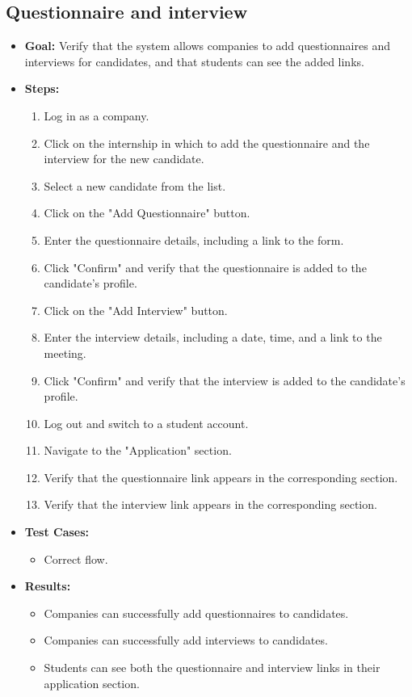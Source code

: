 \subsection{Questionnaire and interview}
\begin{itemize}
    \item \textbf{Goal:} Verify that the system allows companies to add questionnaires and interviews for candidates, and that students can see the added links.

    \item \textbf{Steps:}
    \begin{enumerate}
        \item Log in as a company.
        \item Click on the internship in which to add the questionnaire and the interview for the new candidate.
        \item Select a new candidate from the list.
        \item Click on the "Add Questionnaire" button.
        \item Enter the questionnaire details, including a link to the form.
        \item Click "Confirm" and verify that the questionnaire is added to the candidate’s profile.
        \item Click on the "Add Interview" button.
        \item Enter the interview details, including a date, time, and a link to the meeting.
        \item Click "Confirm" and verify that the interview is added to the candidate’s profile.
        \item Log out and switch to a student account.
        \item Navigate to the "Application" section.
        \item Verify that the questionnaire link appears in the corresponding section.
        \item Verify that the interview link appears in the corresponding section.
    \end{enumerate}

    \item \textbf{Test Cases:}
    \begin{itemize}
        \item Correct flow.
    \end{itemize}

    \item \textbf{Results:}
    \begin{itemize}
        \item Companies can successfully add questionnaires to candidates.
        \item Companies can successfully add interviews to candidates.
        \item Students can see both the questionnaire and interview links in their application section.
    \end{itemize}
\end{itemize}


